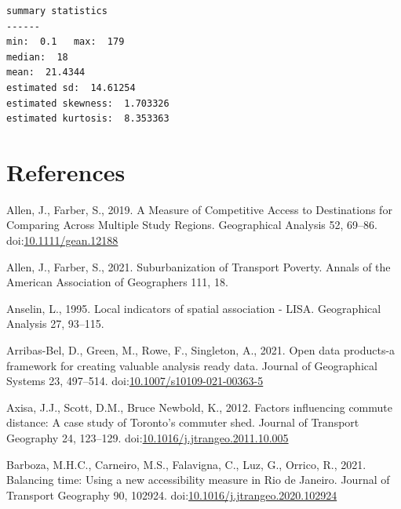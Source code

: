 \documentclass[]{elsarticle} %
\newlength{\cslhangindent}
\newlength{\cslentryspacingunit} %
\newenvironment{CSLReferences}[2] %
 {%
  \setlength{\parindent}{0pt}
  \ifodd #1
  \let\oldpar\par
  \def\par{\hangindent=\cslhangindent\oldpar}
  \fi
  \setlength{\parskip}{#2\cslentryspacingunit}
 }%
 {}
\begin{document}
\begin{verbatim}
summary statistics
------
min:  0.1   max:  179 
median:  18 
mean:  21.4344 
estimated sd:  14.61254 
estimated skewness:  1.703326 
estimated kurtosis:  8.353363 
\end{verbatim}

\hypertarget{references}{%
\section*{References}\label{references}}

\hypertarget{refs}{}
\begin{CSLReferences}{1}{0}
\leavevmode{}%
Allen, J., Farber, S., 2019. A Measure of Competitive Access to
Destinations for Comparing Across Multiple Study Regions. Geographical
Analysis 52, 69--86.
doi:\href{https://doi.org/10.1111/gean.12188}{10.1111/gean.12188}

\leavevmode{}%
Allen, J., Farber, S., 2021. Suburbanization of {Transport} {Poverty}.
Annals of the American Association of Geographers 111, 18.

\leavevmode{}%
Anselin, L., 1995. Local indicators of spatial association - LISA.
Geographical Analysis 27, 93--115.

\leavevmode{}%
Arribas-Bel, D., Green, M., Rowe, F., Singleton, A., 2021. Open data
products-a framework for creating valuable analysis ready data. Journal
of Geographical Systems 23, 497--514.
doi:\href{https://doi.org/10.1007/s10109-021-00363-5}{10.1007/s10109-021-00363-5}

\leavevmode{}%
Axisa, J.J., Scott, D.M., Bruce Newbold, K., 2012. Factors influencing
commute distance: A case study of {Toronto}'s commuter shed. Journal of
Transport Geography 24, 123--129.
doi:\href{https://doi.org/10.1016/j.jtrangeo.2011.10.005}{10.1016/j.jtrangeo.2011.10.005}

\leavevmode{}%
Barboza, M.H.C., Carneiro, M.S., Falavigna, C., Luz, G., Orrico, R.,
2021. Balancing time: {Using} a new accessibility measure in {Rio} de
{Janeiro}. Journal of Transport Geography 90, 102924.
doi:\href{https://doi.org/10.1016/j.jtrangeo.2020.102924}{10.1016/j.jtrangeo.2020.102924}


\end{CSLReferences}
\end{document}
